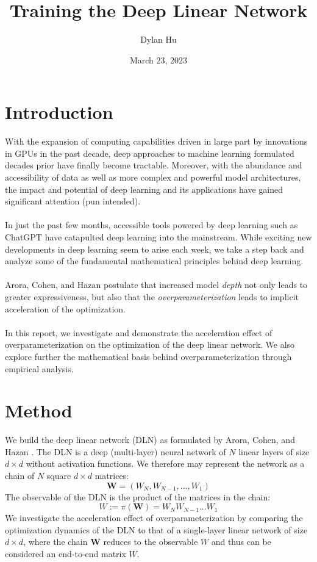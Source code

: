\documentclass[11pt]{article}
\title{Training the Deep Linear Network}
\author{Dylan Hu}
\date{March 23, 2023}
\begin{document}
\maketitle
{
  \hypersetup{linkcolor=black}
  \tableofcontents
}
\section{Introduction}
With the expansion of computing capabilities driven in large part by innovations in GPUs in the past decade, deep approaches to machine learning formulated decades prior have finally become tractable. Moreover, with the abundance and accessibility of data as well as more complex and powerful model architectures, the impact and potential of deep learning and its applications have gained significant attention (pun intended).
\\\\
In just the past few months, accessible tools powered by deep learning such as ChatGPT have catapulted deep learning into the mainstream. While exciting new developments in deep learning seem to arise each week, we take a step back and analyze some of the fundamental mathematical principles behind deep learning.
\\\\
Arora, Cohen, and Hazan \cite{arora2018optimization} postulate that increased model \textit{depth} not only leads to greater expressiveness, but also that the \textit{overparameterization} leads to implicit acceleration of the optimization.
\\\\
In this report, we investigate and demonstrate the acceleration effect of overparameterization on the optimization of the deep linear network. We also explore further the mathematical basis behind overparameterization through empirical analysis.

\pagebreak

\section{Method}
We build the deep linear network (DLN) as formulated by Arora, Cohen, and Hazan \cite{arora2018optimization}. The DLN is a deep (multi-layer) neural network of $N$ linear layers of size $d \times d$ without activation functions. We therefore may represent the network as a chain of $N$ square $d \times d$ matrices:
$$\bm{W} = \left(W_N, W_{N-1}, \hdots, W_1\right)$$
The observable of the DLN is the product of the matrices in the chain:
$$W := \pi\left(\bm{W}\right) = W_N W_{N-1} \hdots W_1$$
We investigate the acceleration effect of overparameterization by comparing the optimization dynamics of the DLN to that of a single-layer linear network of size $d \times d$, where the chain $\bm{W}$ reduces to the observable $W$ and thus can be considered an end-to-end matrix $W$.
\end{document}
